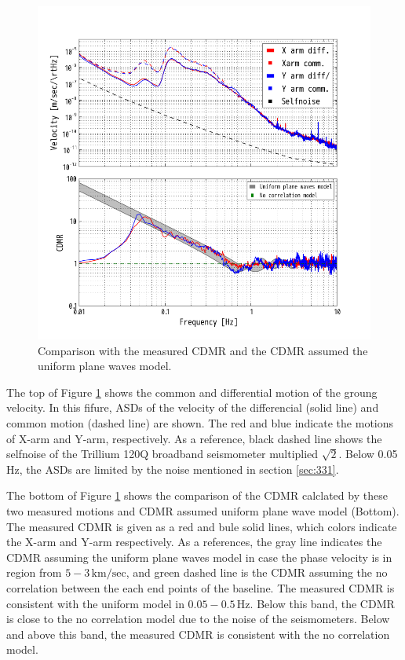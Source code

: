 \begin{figure}[h]
    \begin{center}   
      \includegraphics[width=13.0cm]{./img_chap3/img319.png}
      \caption{Comparison with the measured CDMR and the CDMR assumed the uniform plane waves model.}\label{img:img319}
    \end{center}
\end{figure}

The top of Figure \ref{img:img319} shows the common and differential motion of the groung velocity. In this fifure, ASDs of the velocity of the differencial (solid line) and common motion (dashed line) are shown. The red and blue indicate the motions of X-arm and Y-arm, respectively. As a reference, black dashed line shows the selfnoise of the Trillium 120Q broadband seismometer multiplied $\sqrt{2}$. Below 0.05 Hz, the ASDs are limited by the noise mentioned in section \cref{sec:331}. 

The bottom of Figure \ref{img:img319} shows the comparison of the CDMR calclated by these two measured motions and CDMR assumed uniform plane wave model (Bottom). The measured CDMR is given as a red and bule solid lines, which colors indicate the X-arm and Y-arm respectively. As a references, the gray line indicates the CDMR assuming the uniform plane waves model in case the phase velocity is in region from $5 - 3\,\mathrm{km/sec}$, and green dashed line is the CDMR assuming the no correlation between the each end points of the baseline. The measured CDMR is consistent with the uniform model in $0.05 - 0.5\,\mathrm{Hz}$. Below this band, the CDMR is close to the no correlation model due to the noise of the seismometers. Below and above this band, the measured CDMR is consistent with the no correlation model.


